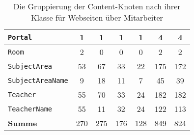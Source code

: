 \begin{table}[!h]
\begin{tabular}{|l|c|c|c|c|c|c|}
                \texttt{Portal}             & 1                                  & 1                                   & 1                                    & 1                                  & 4                                   & 4                                  \\ \hline
                \texttt{Room}               & 2                                  & 0                                   & 0                                    & 0                                  & 2                                   & 2                                  \\ \hline
                \texttt{SubjectArea}        & 53                                 & 67                                  & 33                                   & 22                                 & 175                                 & 172                                \\ \hline
                \texttt{SubjectAreaName}    & 9                                  & 18                                  & 11                                   & 7                                  & 45                                  & 39                                 \\ \hline
                \texttt{Teacher}            & 55                                 & 70                                  & 33                                   & 24                                 & 182                                 & 182                                \\ \hline
                \texttt{TeacherName}        & 55                                 & 11                                  & 32                                   & 24                                 & 122                                 & 113                                \\ \hline
                \hline
                \textbf{Summe}     & 270                                & 275                                 & 176                                  & 128                                & 849                                 & 824                                \\ \hline
            \end{tabular}
            \caption{Die Gruppierung der Content-Knoten nach ihrer Klasse für Webseiten über Mitarbeiter}
            \label{table:findingsTeachersFiguresContentNodesByClass}
        \end{table}

